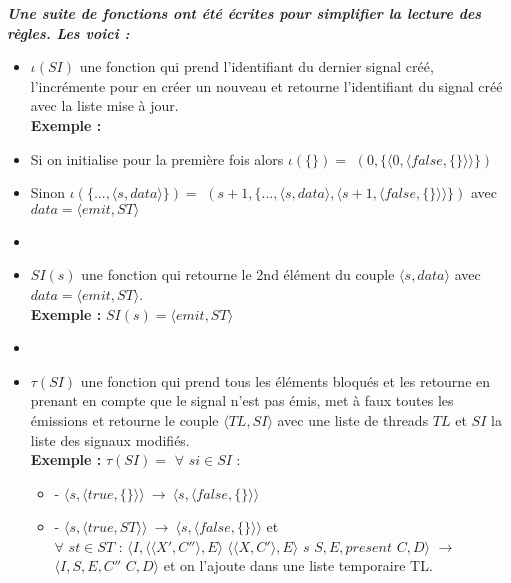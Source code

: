 \documentclass[10pt,a4paper]{article}
\begin{document}
					
				\textbf{\textit{Une suite de fonctions ont été écrites pour simplifier la lecture des règles. Les voici :}}
				\smallbreak
				\begin{itemize}
					\item[] $\iota(SI)$ une fonction qui prend l'identifiant du dernier signal créé, l'incrémente pour en créer un nouveau et retourne l'identifiant du signal créé avec la liste mise à jour.
					\\ \textbf{Exemple :}
					\item[] Si on initialise pour la première fois alors  $\iota(\{\}) =$ $(0 ,\{\langle 0,\langle false,\{\}\rangle\rangle\})$
					\item[] Sinon $\iota(\{...,\langle s,data\rangle\}) =$ $(s+1 ,\{...,\langle s,data\rangle,\langle s+1,\langle false,\{\}\rangle\rangle\})$ avec $data = \langle emit,ST\rangle$
					\item[] 
					
					\item[] $SI(s)$ une fonction qui retourne le 2nd élément du couple $\langle s,data\rangle$ avec $data = \langle emit,ST\rangle$.
					\\\textbf{Exemple :} $SI(s) = \langle emit,ST\rangle$
					\item[]  
					
					\item[] $\tau(SI)$ une fonction qui prend tous les éléments bloqués et les retourne en prenant en compte que le signal n'est pas émis, met à faux toutes les émissions et retourne le couple $\langle TL,SI \rangle$ avec une liste de threads $TL$ et $SI$ la liste des signaux modifiés. 
					\\ \textbf{Exemple :} $\tau(SI) =$ $\forall$ $si \in SI$ : 
					\begin{itemize}
						\item[] - $\langle s,\langle true,\{\}\rangle\rangle~\rightarrow~\langle s,\langle false,\{\}\rangle\rangle$
						\item[] - $\langle s,\langle true,ST\rangle\rangle~\rightarrow~\langle s,\langle false,\{\}\rangle\rangle$ et 
						\\$\forall$ $st \in ST$ : $\langle I,\langle\langle X',C''\rangle, E\rangle$ $\langle\langle X,C'\rangle, E\rangle$ $s$ $S,E,present$ $C,D\rangle$ $\rightarrow$ $ \langle I,S,E,C''$ $C,D\rangle$ et on l'ajoute dans une liste temporaire TL.
					\end{itemize}
				\end{itemize}
				\bigbreak
				\bigbreak
					
\end{document}
